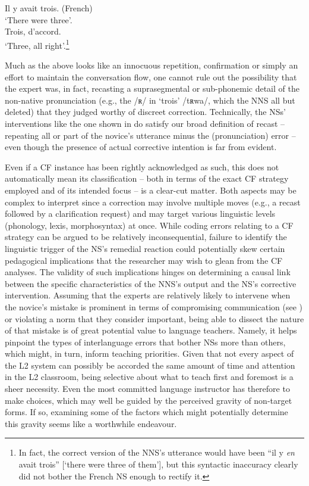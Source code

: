 \documentclass[output=paper,colorlinks,citecolor=brown,modfonts,nonflat]{../langscibook}
\begin{document}
\ea\label{ex:scheuer:10}
{\NNS} {Il} {y} {avait} {trois.}  (French)\\
‘There were three’.\\
{\NS} {Trois,} {d’accord.}\\
‘Three, all right’.\footnote{ {In fact, the correct version of the NNS’s utterance would have been “il y} {\textit{en}} {avait trois” [‘there were three of them’], but this syntactic inaccuracy clearly did not bother the French NS enough to rectify it.}}
\z


Much as the above looks like an innocuous repetition, confirmation or simply an effort to maintain the conversation flow, one cannot rule out the possibility that the expert was, in fact, recasting a suprasegmental or sub-phonemic detail of the non-native pronunciation (e.g., the /ʀ/ in ‘trois’ /tʀwa/, which the NNS all but deleted) that they judged worthy of discreet correction. Technically, the NSs’ interventions like the one shown in  do satisfy our broad definition of recast – repeating all or part of the novice’s utterance minus the (pronunciation) error – even though the presence of actual corrective intention is far from evident.



Even if a CF instance has been rightly acknowledged as such, this does not automatically mean its classification – both in terms of the exact CF strategy employed and of its intended focus – is a clear-cut matter. Both aspects may be complex to interpret since a correction may involve multiple moves (e.g., a recast followed by a clarification request) and may target various linguistic levels (phonology, lexis, morphosyntax) at once. While coding errors relating to a CF strategy can be argued to be relatively inconsequential, failure to identify the linguistic trigger of the NS’s remedial reaction could potentially skew certain pedagogical implications that the researcher may wish to glean from the CF analyses. The validity of such implications hinges on determining a causal link between the specific characteristics of the NNS’s output and the NS’s corrective intervention. Assuming that the experts are relatively likely to intervene when the novice’s mistake is prominent in terms of compromising communication (see ) or violating a norm that they consider important, being able to dissect the nature of that mistake is of great potential value to language teachers. Namely, it helps pinpoint the types of interlanguage errors that bother NSs more than others, which might, in turn, inform teaching priorities. Given that not every aspect of the L2 system can possibly be accorded the same amount of time and attention in the L2 classroom, being selective about what to teach first and foremost is a sheer necessity. Even the most committed language instructor has therefore to make choices, which may well be guided by the perceived gravity of non-target forms. If so, examining some of the factors which might potentially determine this gravity seems like a worthwhile endeavour.
\end{document}
